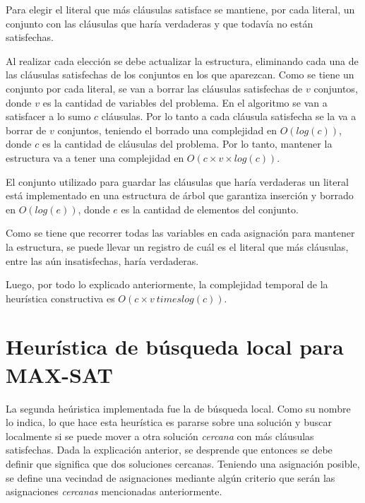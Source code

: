 \documentclass[a4paper,10pt]{article}
\begin{document}
Para elegir el literal que más cl\'ausulas satisface se mantiene, por cada literal, un conjunto con las cl\'ausulas que haría verdaderas y que todavía no están satisfechas.

Al realizar cada elección se debe actualizar la estructura, eliminando cada una de las cláusulas satisfechas de los conjuntos en los que aparezcan. Como se tiene un conjunto por cada literal, se van a borrar las cláusulas satisfechas de $v$ conjuntos, donde $v$ es la cantidad de variables del problema. En el algoritmo se van a satisfacer a lo sumo $c$ cláusulas. Por lo tanto a cada cláusula satisfecha se la va a borrar de $v$ conjuntos, teniendo el borrado una complejidad en $O\left( log \left( c \right) \right)$, donde $c$ es la cantidad de cláusulas del problema. Por lo tanto, mantener la estructura va a tener una complejidad en $O\left( c \times v \times log \left( c \right) \right)$.

El conjunto utilizado para guardar las cl\'ausulas que haría verdaderas un literal está implementado en una estructura de árbol que garantiza inserción y borrado en $O\left( log \left( e \right) \right)$, donde $e$ es la cantidad de elementos del conjunto.

Como se tiene que recorrer todas las variables en cada asignación para mantener la estructura, se puede llevar un registro de cuál es el literal que más cláusulas, entre las aún insatisfechas, haría verdaderas. 

Luego, por todo lo explicado anteriormente, la complejidad temporal de la heur\'istica constructiva es $O\left( c \times v \ times log \left( c \right) \right)$.



\section*{Heur\'istica de b\'usqueda local para MAX-SAT}

La segunda he\'uristica implementada fue la de b\'usqueda local. Como su nombre lo indica, lo que hace esta heur\'istica es pararse sobre una soluci\'on y buscar localmente si se puede mover a otra soluci\'on \emph{cercana} con m\'as cl\'ausulas satisfechas. Dada la explicaci\'on anterior, se desprende que entonces se debe definir que significa que dos soluciones cercanas. Teniendo una asignaci\'on posible, se define una vecindad de asignaciones mediante alg\'un criterio que ser\'an las asignaciones \emph{cercanas} mencionadas anteriormente.
\end{document}
